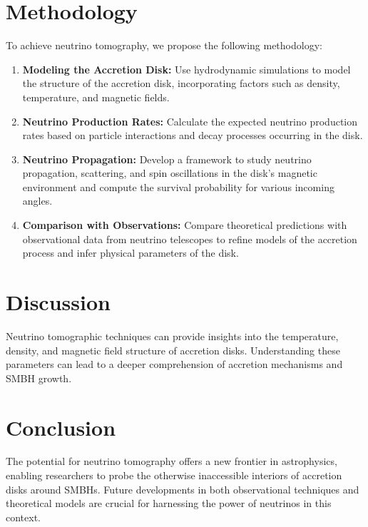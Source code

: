 \documentclass{article}
\begin{document}
\section{Methodology}
\noindent
To achieve neutrino tomography, we propose the following methodology:
\begin{enumerate}
    \item \textbf{Modeling the Accretion Disk:} Use hydrodynamic simulations to model the structure of the accretion disk, incorporating factors such as density, temperature, and magnetic fields.
    \item \textbf{Neutrino Production Rates:} Calculate the expected neutrino production rates based on particle interactions and decay processes occurring in the disk.
    \item \textbf{Neutrino Propagation:} Develop a framework to study neutrino propagation, scattering, and spin oscillations in the disk's magnetic environment and compute the survival probability for various incoming angles.
    \item \textbf{Comparison with Observations:} Compare theoretical predictions with observational data from neutrino telescopes to refine models of the accretion process and infer physical parameters of the disk.
\end{enumerate}
\section{Discussion}
\noindent
Neutrino tomographic techniques can provide insights into the temperature, density, and magnetic field structure of accretion disks. Understanding these parameters can lead to a deeper comprehension of accretion mechanisms and SMBH growth.
\section{Conclusion}
\noindent
The potential for neutrino tomography offers a new frontier in astrophysics, enabling researchers to probe the otherwise inaccessible interiors of accretion disks around SMBHs. Future developments in both observational techniques and theoretical models are crucial for harnessing the power of neutrinos in this context.
\newpage


\end{document}
